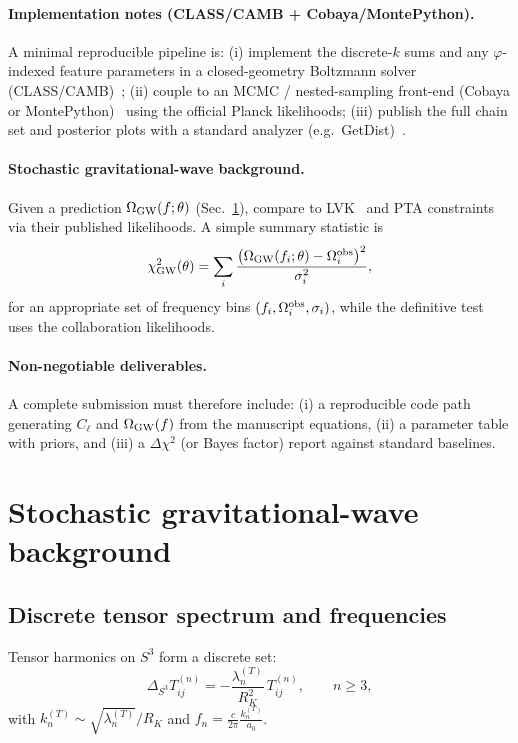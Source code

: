 \documentclass[
  reprint,
  amsmath,amssymb,
  aps,
  prd,
  superscriptaddress,
  nofootinbib,
  longbibliography
]{revtex4-2}
\newcommand{\phig}{\varphi}
\newcommand{\Sthree}{S^{3}}
\theoremstyle{definition}
\theoremstyle{remark}
\begin{document}
\paragraph{Implementation notes (CLASS/CAMB + Cobaya/MontePython).}
A minimal reproducible pipeline is: (i) implement the discrete-$k$ sums and any $\phig$-indexed feature parameters in a closed-geometry Boltzmann solver
(CLASS/CAMB)~\cite{Blas2011CLASS,Lewis2000CAMB}; (ii) couple to an MCMC / nested-sampling front-end
(Cobaya or MontePython)~\cite{TorradoLewis2021Cobaya,Audren2013MontePython} using the official Planck likelihoods;
(iii) publish the full chain set and posterior plots with a standard analyzer (e.g.\ GetDist)~\cite{Lewis2019GetDist}.

\paragraph{Stochastic gravitational-wave background.}
Given a prediction $\Omega_{\rm GW}(f;\theta)$ (Sec.~\ref{sec:sgwb}), compare to LVK~\cite{LVK2021ISGWB} and PTA constraints via
their published likelihoods. A simple summary statistic is
\begin{equation}
\chi^2_{\rm GW}(\theta)=\sum_i \frac{\big(\Omega_{\rm GW}(f_i;\theta)-\Omega^{\rm obs}_i\big)^2}{\sigma_i^2},
\label{eq:chi2_GW}
\end{equation}
for an appropriate set of frequency bins $(f_i,\Omega^{\rm obs}_i,\sigma_i)$, while the definitive test
uses the collaboration likelihoods.

\paragraph{Non-negotiable deliverables.}
A complete submission must therefore include: (i) a reproducible code path generating $C_\ell$ and
$\Omega_{\rm GW}(f)$ from the manuscript equations, (ii) a parameter table with priors, and
(iii) a $\Delta\chi^2$ (or Bayes factor) report against standard baselines.


\section{Stochastic gravitational-wave background}
\label{sec:sgwb}
\subsection{Discrete tensor spectrum and frequencies}
Tensor harmonics on $\Sthree$ form a discrete set:
\begin{equation}
\Delta_{\Sthree}T^{(n)}_{ij}=-\frac{\lambda^{(T)}_n}{R_K^2}\,T^{(n)}_{ij},\qquad n\ge 3,
\label{eq:S3_tensor_eigs}
\end{equation}
with $k^{(T)}_n\sim \sqrt{\lambda^{(T)}_n}/R_K$ and $f_n=\frac{c}{2\pi}\frac{k^{(T)}_n}{a_0}$.
\end{document}
